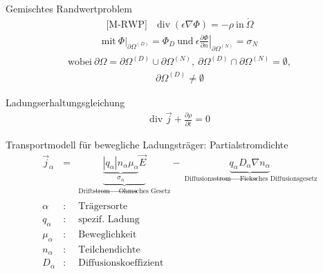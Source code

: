 \documentclass[a6paper]{kartei}
\renewcommand{\div}{\mathrm{div}\;}
\begin{document}
\begin{karte}{Gemischtes Randwertproblem}
\begin{eqnarray*}
  \text{[M-RWP]} \quad \div(\epsilon \nabla \Phi) = - \rho \ \text{in} \ \mathring{\Omega} \nonumber 
\end{eqnarray*}  
\begin{eqnarray*}
\text{mit} \ \Phi|_{\partial \Omega^{(D)}} = \Phi_{D} \ \text{und} \ \epsilon \left. \frac{\partial \Phi}{\partial n} \right|_{\partial \Omega^{(N)}} = \sigma_{N} \nonumber 
\end{eqnarray*}
\begin{eqnarray*} 
\text{wobei} \ \partial \Omega = \partial \Omega^{(D)} \cup \partial \Omega^{(N)}, \ \partial \Omega^{(D)} \cap \partial \Omega^{(N)} = \emptyset, \nonumber 
\end{eqnarray*} 
\begin{eqnarray*}
\partial \Omega^{(D)} \neq \emptyset 
\end{eqnarray*} 
\end{karte}


\begin{karte}{Ladungserhaltungsgleichung}
\begin{eqnarray*}
 \div \vec{j} + \frac{\partial \rho}{\partial t} = 0
\end{eqnarray*}
\end{karte}

\begin{karte}{Transportmodell für bewegliche Ladungsträger: Partialstromdichte}
 \begin{eqnarray*}
  \vec{j}_{\alpha} & = & \underbrace{\underbrace{|q_{\alpha}| n_{\alpha} \mu_{\alpha}}_{\sigma_{\alpha}} \vec{E}}_{\text{Driftstrom $\rightarrow$
Ohmsches Gesetz}} - \underbrace{q_{\alpha} D_{\alpha} \nabla n_{\alpha}}_{\text{ Diffusionsstrom $\rightarrow$
Ficksches Diffusionsgesetz}} \\
 \nonumber \\
  \alpha & : &  \text{Trägersorte} \nonumber \\
  q_{\alpha} & : &   \text{spezif. Ladung} \nonumber \\ 
 \mu_{\alpha} & : &  \text{Beweglichkeit} \nonumber \\ 
 n_{\alpha} & : &  \text{Teilchendichte} \nonumber \\ 
 D_{\alpha} & : &  \text{Diffusionskoeffizient} \nonumber 
\end{eqnarray*}
\end{karte}
\end{document}

